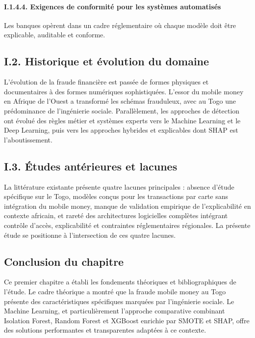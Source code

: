 \documentclass[
  12pt,
]{article}
\begin{document}
\paragraph{I.1.4.4. Exigences de conformité pour les systèmes
automatisés}\label{i.1.4.4.-exigences-de-conformituxe9-pour-les-systuxe8mes-automatisuxe9s}

Les banques opèrent dans un cadre réglementaire où chaque modèle doit
être explicable, auditable et conforme.

\subsection{I.2. Historique et évolution du
domaine}\label{i.2.-historique-et-uxe9volution-du-domaine}

L’évolution de la fraude financière est passée de formes physiques et
documentaires à des formes numériques sophistiquées. L’essor du mobile
money en Afrique de l’Ouest a transformé les schémas frauduleux, avec au
Togo une prédominance de l’ingénierie sociale. Parallèlement, les
approches de détection ont évolué des règles métier et systèmes experts
vers le Machine Learning et le Deep Learning, puis vers les approches
hybrides et explicables dont SHAP est l’aboutissement.

\subsection{I.3. Études antérieures et
lacunes}\label{i.3.-uxe9tudes-antuxe9rieures-et-lacunes}

La littérature existante présente quatre lacunes principales : absence
d’étude spécifique sur le Togo, modèles conçus pour les transactions par
carte sans intégration du mobile money, manque de validation empirique
de l’explicabilité en contexte africain, et rareté des architectures
logicielles complètes intégrant contrôle d’accès, explicabilité et
contraintes réglementaires régionales. La présente étude se positionne à
l’intersection de ces quatre lacunes.

\subsection{Conclusion du chapitre}\label{conclusion-du-chapitre}

Ce premier chapitre a établi les fondements théoriques et
bibliographiques de l’étude. Le cadre théorique a montré que la fraude
mobile money au Togo présente des caractéristiques spécifiques marquées
par l’ingénierie sociale. Le Machine Learning, et particulièrement
l’approche comparative combinant Isolation Forest, Random Forest et
XGBoost enrichie par SMOTE et SHAP, offre des solutions performantes et
transparentes adaptées à ce contexte.
\end{document}
